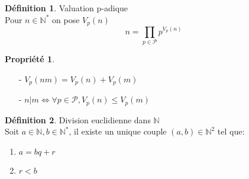 \documentclass[fleqn]{article}
\theoremstyle{definition} \newtheorem*{defi}{D\'efinition}
\theoremstyle{definition} \newtheorem*{theo}{Th\'eor\`eme}
\theoremstyle{definition} \newtheorem*{coro}{Corollaire}
\theoremstyle{remark} \newtheorem*{rqs}{Remarques}
\theoremstyle{definition} \newtheorem*{prop}{Propri\'et\'e}
\begin{document}
\begin{defi} Valuation p-adique \\
	Pour $n \in \mathbb{N}^*$ on pose $V_p(n)$ \\
		\[n = \prod_{p \in \mathcal{P}} p^{V_p(n)}\]
\end{defi}
\begin{prop} $ $
	\begin{itemize}
		\item [-] $V_p(nm) = V_p(n) + V_p(m)$
		\item [-] $n|m \Leftrightarrow \forall p \in \mathcal{P}, V_p(n) \leq V_p(m)$
	\end{itemize}
\end{prop}

\begin{defi} Division euclidienne dans $\mathbb{N}$ \\
	Soit $a \in \mathbb{N}, b \in \mathbb{N}^*$, il existe un unique couple $(a,b) \in \mathbb{N}^2$ tel que:
	\begin{enumerate}
		\item $a = bq + r$
		\item $r < b$
	\end{enumerate}
\end{defi}
\end{document}
